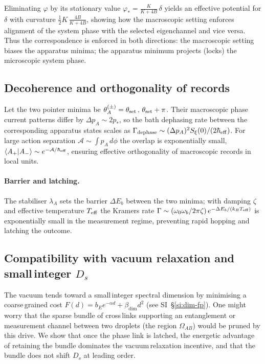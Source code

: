 \documentclass[11pt]{article}
\begin{document}
Eliminating $\varphi$ by its stationary value $\varphi_*=\tfrac{K}{K+4B}\,\delta$ yields an effective potential for $\delta$ with curvature $\tfrac12 K\,\tfrac{4B}{K+4B}$, showing how the macroscopic setting enforces alignment of the system phase with the selected eigenchannel and vice versa. Thus the correspondence is enforced in both directions: the macroscopic setting biases the apparatus minima; the apparatus minimum projects (locks) the microscopic system phase.

\subsection{Decoherence and orthogonality of records}
Let the two pointer minima be $\theta_A^{(\pm)}=\theta_{\rm set}\,,\,\theta_{\rm set}+\pi$. Their macroscopic phase\,current patterns differ by $\Delta p_A\sim 2p_*$, so the bath dephasing rate between the corresponding apparatus states scales as $\Gamma_{\rm dephase}\sim (\Delta p_A)^2 S_\xi(0)/(2\hbar_{\rm eff})$. For large action separation $\mathcal A\sim \int p_A\,d\phi$ the overlap is exponentially small, $\langle A_+|A_-\rangle\sim e^{-\mathcal A/\hbar_{\rm eff}}$, ensuring effective orthogonality of macroscopic records in local units.

\paragraph{Barrier and latching.} The stabiliser $\lambda_A$ sets the barrier $\Delta E_b$ between the two minima; with damping $\zeta$ and effective temperature $T_{\rm eff}$ the Kramers rate $\Gamma\sim (\omega_0\omega_b/2\pi\zeta)\,e^{-\Delta E_b/(k_B T_{\rm eff})}$ is exponentially small in the measurement regime, preventing rapid hopping and latching the outcome.

\subsection{Compatibility with vacuum relaxation and small\,integer $D_s$}
The vacuum tends toward a small\,integer spectral dimension by minimising a coarse\,grained cost $F(d)=b_E e^{-\alpha d}+\beta_{\mathrm{dim}} d^2$ (see SI~\S\ref{si:dim-fp}). One might worry that the sparse bundle of cross\,links supporting an entanglement or measurement channel between two droplets (the region $\Omega_{AB}$) would be pruned by this drive. We show that once the phase link is latched, the energetic advantage of retaining the bundle dominates the vacuum\,relaxation incentive, and that the bundle does not shift $D_s$ at leading order.
\end{document}
